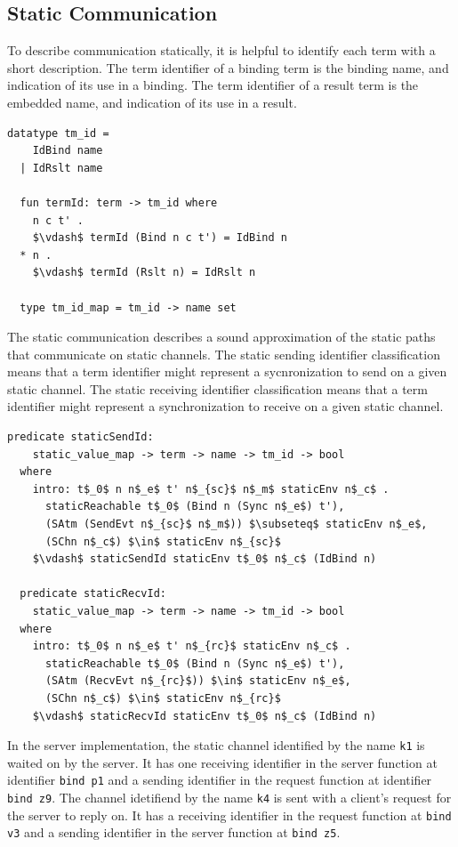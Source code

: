 \documentclass[letterpaper, 11pt]{extarticle}
\begin{document}
\subsection{Static Communication}
To describe communication statically, it is helpful to identify each term with a short description.
The term identifier of a binding term is the binding name, and indication of its use in a binding.
The term identifier of a result term is the embedded name, and indication of its use in a result.

\begin{lstlisting}[language=logic, mathescape]
  datatype tm_id =
    IdBind name
  | IdRslt name 

  fun termId: term -> tm_id where
    n c t' . 
    $\vdash$ termId (Bind n c t') = IdBind n
  * n . 
    $\vdash$ termId (Rslt n) = IdRslt n

  type tm_id_map = tm_id -> name set
\end{lstlisting}

The static communication describes a sound approximation of
the static paths that communicate on static channels.
The static sending identifier classification means that a term identifier might represent a
sycnronization to send on a given static channel.
The static receiving identifier classification means that a term identifier might represent a
synchronization to receive on a given static channel. 

\begin{lstlisting}[language=logic, mathescape]
  predicate staticSendId:
    static_value_map -> term -> name -> tm_id -> bool 
  where
    intro: t$_0$ n n$_e$ t' n$_{sc}$ n$_m$ staticEnv n$_c$ .
      staticReachable t$_0$ (Bind n (Sync n$_e$) t'),
      (SAtm (SendEvt n$_{sc}$ n$_m$)) $\subseteq$ staticEnv n$_e$, 
      (SChn n$_c$) $\in$ staticEnv n$_{sc}$
    $\vdash$ staticSendId staticEnv t$_0$ n$_c$ (IdBind n)

  predicate staticRecvId:
    static_value_map -> term -> name -> tm_id -> bool
  where
    intro: t$_0$ n n$_e$ t' n$_{rc}$ staticEnv n$_c$ .
      staticReachable t$_0$ (Bind n (Sync n$_e$) t'),
      (SAtm (RecvEvt n$_{rc}$)) $\in$ staticEnv n$_e$, 
      (SChn n$_c$) $\in$ staticEnv n$_{rc}$ 
    $\vdash$ staticRecvId staticEnv t$_0$ n$_c$ (IdBind n)
\end{lstlisting}


In the server implementation,
the static channel identified by the name \lstinline{k1} is waited on
by the server. It has one receiving identifier in the server function
at identifier \lstinline[language=sugar_lang]{bind p1} and a sending identifier 
in the request function at identifier \lstinline[language=sugar_lang]{bind z9}.
The channel idetifiend by the name \lstinline{k4} is sent with a client's request for
the server to reply on. It has a receiving identifier in the request function at
\lstinline[language=sugar_lang]{bind v3} and a sending identifier in the server function at
\lstinline[language=sugar_lang]{bind z5}.
\end{document}

